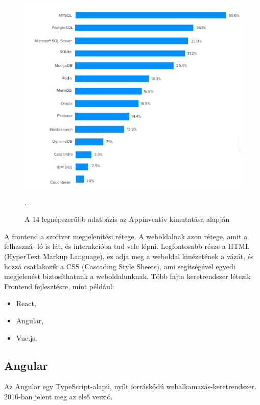 \begin{figure}[h]
\centering
\includegraphics[scale=0.6]{images/top14_database.png}
\caption{A 14 legnépszerűbb adatbázis az Appinventiv kimutatása alapján \cite{databases}}.
\label{fig:Adatbázisok}
\end{figure}
\newpage


A frontend a szoftver megjelenítési rétege. A weboldalnak azon rétege, amit a felhaszná-
ló is lát, és interakcióba tud vele lépni. Legfontosabb része a HTML (HyperText Markup Language), ez adja meg a weboldal kinézetének a vázát, és hozzá csatlakozik a CSS (Cascading Style Sheets), ami segítségével egyedi megjelenést biztosíthatunk a weboldalunknak. Több fajta keretrendszer létezik Frontend fejlesztésre, mint például:

\begin{itemize}
\item React,
\item Angular,
\item Vue.js.
\end{itemize}


\subsection{Angular}

Az Angular \cite{Angular} egy TypeScript-alapú, nyílt forráskódú webalkamazás-keretrendszer. 2016-ban jelent meg az első verzió.

